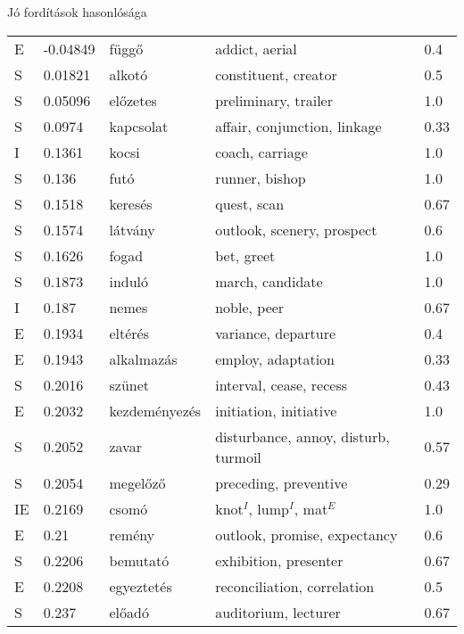 \documentclass{beamer}
\newcommand{\e}{$^E$}
\newcommand{\id}{$^I$}
\begin{document}
  \begin{frame}[allowframebreaks]{Jó fordítások hasonlósága} 
    \small
    \begin{longtable}{lllll}
      \toprule
        E	& -0.04849	& függő	& addict, aerial	& 0.4 \\
        S	& 0.01821	& alkotó	& constituent, creator	& 0.5 \\
        S	& 0.05096	& előzetes	& preliminary, trailer	& 1.0 \\
        S	& 0.0974	& kapcsolat	& affair, conjunction, linkage	& 0.33 \\
        I	& 0.1361	& kocsi	& coach, carriage	& 1.0 \\
        S	& 0.136	& futó	& runner, bishop	& 1.0 \\
        S	& 0.1518	& keresés	& quest, scan	& 0.67 \\
        S	& 0.1574	& látvány	& outlook, scenery, prospect	& 0.6 \\
        S	& 0.1626	& fogad	& bet, greet	& 1.0 \\
        S	& 0.1873	& induló	& march, candidate	& 1.0 \\
        I	& 0.187	& nemes	& noble, peer	& 0.67 \\
        E	& 0.1934	& eltérés	& variance, departure	& 0.4 \\
        E	& 0.1943	& alkalmazás	& employ, adaptation	& 0.33 \\
        S	& 0.2016	& szünet	& interval, cease, recess	& 0.43 \\
        E	& 0.2032	& kezdeményezés	& initiation, initiative	& 1.0 \\
        S	& 0.2052	& zavar	& disturbance, annoy, disturb, turmoil	& 0.57 \\
        S	& 0.2054	& megelőző	& preceding, preventive	& 0.29 \\
        IE& 0.2169	& csomó	& knot\id, lump\id, mat\e	& 1.0  \\
        E\footnotemark
        & 0.21	& remény	& outlook, promise, expectancy	& 0.6	  \\
        S	& 0.2206	& bemutató	& exhibition, presenter	& 0.67 \\
        E	& 0.2208	& egyeztetés	& reconciliation, correlation	& 0.5 \\
        S	& 0.237	& előadó	& auditorium, lecturer	& 0.67 \\

\end{longtable}
\end{frame}
\end{document}
